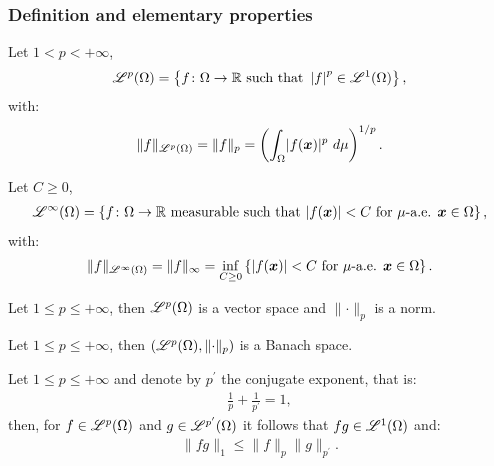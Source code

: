 \subsubsection{Definition and elementary properties}

\begin{definition}[$\Lp{p}(\Omega)$]
    Let $1 < p < +\infty$,
    \begin{gather}
        \mathscr{L}^{p}(\Omega) = \left\{ f \colon \Omega \rightarrow \mathbb{R} \text{ such that } \left| f \right|^p \in \mathscr{L}^{1}(\Omega) \right\},
    \end{gather}
    with:
    \begin{gather}
    \lVert f \rVert_{\mathscr{L}^{p}(\Omega)} = \lVert f \rVert_{p} = \left( \int_{\Omega} \lvert f(\bm{x}) \rvert^p ~ d \mu \right)^{1/p}.
    \end{gather}
\end{definition}

\begin{definition}[$\Lp{\infty}(\Omega)$]
    Let $C \geq 0$,
    \begin{gather}
        \mathscr{L}^{\infty}(\Omega) = \left\{ f \colon \Omega \rightarrow \mathbb{R} \text{ measurable such that } \lvert f(\bm{x}) \rvert < C \text{ for } \mu \text{-a.e. } \bm{x} \in \Omega \right\},
    \end{gather}
    with:
    \begin{gather}
    \lVert f \rVert_{\mathscr{L}^{\infty}(\Omega)} = \lVert f \rVert_{\infty} = \inf_{C \geq 0} \left\{ \lvert f(\bm{x}) \rvert < C \text{ for } \mu \text{-a.e. } \bm{x} \in \Omega \right\}.
    \end{gather}
\end{definition}

\begin{theorem}
    Let $1 \leq p \leq +\infty$, then $\Lp{p}(\Omega)$ is a vector space and $\lVert \cdot \rVert_p$ is a norm.
\end{theorem}

\begin{theorem}
    Let $1 \leq p \leq +\infty$, then $(\mathscr{L}^{p}(\Omega), \lVert \cdot \rVert_p)$ is a Banach space.
\end{theorem}

\begin{theorem}
    Let $1 \leq p \leq +\infty$ and denote by $p^{\prime}$ the conjugate exponent, that is:
    \begin{gather}
        \frac{1}{p} + \frac{1}{p^{\prime}} = 1,
    \end{gather}
    then, for $f \in \mathscr{L}^{p}(\Omega)$ and $g \in \mathscr{L}^{p^{\prime}}(\Omega)$ it follows that $fg \in \mathscr{L}^{1}(\Omega)$ and:
    \begin{gather}
        \lVert fg \rVert_1 \leq \lVert f \rVert_p \lVert g \rVert_{p^{\prime}}.
    \end{gather}
\end{theorem}

